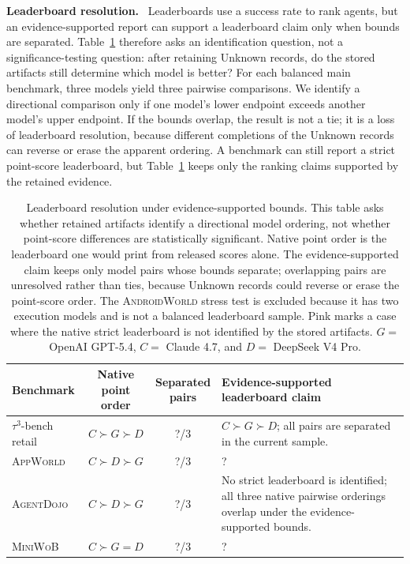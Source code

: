 \documentclass{article}
\newcommand{\agentdojo}{\textsc{AgentDojo}\xspace}
\newcommand{\appworld}{\textsc{AppWorld}\xspace}
\newcommand{\tauthree}{\(\tau^3\)-bench retail\xspace}
\newcommand{\androidworld}{\textsc{AndroidWorld}\xspace}
\newcommand{\miniwob}{\textsc{MiniWoB}\xspace}
\newcommand{\fillfromdata}{\textsc{\color{red}?}}
\newcommand{\runin}[1]{\noindent\textbf{#1}\ }
\providecommand{\ADJIdentifiedPairs}{\fillfromdata}
\providecommand{\APPIdentifiedPairs}{\fillfromdata}
\providecommand{\APPRankingTakeaway}{\fillfromdata}
\providecommand{\MWBIdentifiedPairs}{\fillfromdata}
\providecommand{\MWBRankingTakeaway}{\fillfromdata}
\providecommand{\TAUIdentifiedPairs}{\fillfromdata}
\begin{document}
\runin{Leaderboard resolution.}
Leaderboards use a success rate to rank agents, but an evidence-supported
report can support a leaderboard claim only when bounds are
separated. Table~\ref{tab:main-results-C} therefore asks an identification
question, not a significance-testing question: after retaining Unknown records,
do the stored artifacts still determine which model is better? For each
balanced main benchmark, three models yield three pairwise comparisons. We identify a
directional comparison only if one model's lower endpoint exceeds another
model's upper endpoint. If the bounds overlap, the result is not a tie; it is a
loss of leaderboard resolution, because different completions of the Unknown
records can reverse or erase the apparent ordering. A benchmark can still
report a strict point-score leaderboard, but Table~\ref{tab:main-results-C}
keeps only the ranking claims supported by the retained evidence.

\begin{table}[t]
\centering
\caption{Leaderboard resolution under evidence-supported bounds. This table
asks whether retained artifacts identify a directional model ordering, not
whether point-score differences are statistically significant. Native point
order is the leaderboard one would print from released scores alone. The
evidence-supported claim keeps only model pairs whose bounds separate;
overlapping pairs are unresolved rather than ties, because Unknown records could
reverse or erase the point-score order. The \androidworld stress test is
excluded because it has two execution models and is not a balanced leaderboard
sample. Pink marks a case where the native strict leaderboard is not identified
by the stored artifacts. \(G=\) OpenAI GPT-5.4, \(C=\) Claude 4.7, and
\(D=\) DeepSeek V4 Pro.}
\label{tab:main-results-C}
\footnotesize
\setlength{\tabcolsep}{4pt}
\renewcommand{\arraystretch}{1.14}
\begin{tabularx}{\textwidth}{@{}lccX@{}}
\toprule
Benchmark & \makecell{Native\\point order} & \makecell{Separated\\pairs} & Evidence-supported leaderboard claim \\
\midrule
\tauthree & \(C \succ G \succ D\) & \TAUIdentifiedPairs/3 & \(C \succ G \succ D\); all pairs are separated in the current sample. \\
\appworld & \(C \succ D \succ G\) & \APPIdentifiedPairs/3 & \APPRankingTakeaway \\
\rowcolor{problemrow}
\agentdojo & \(C \succ D \succ G\) & \ADJIdentifiedPairs/3 & No strict leaderboard is identified; all three native pairwise orderings overlap under the evidence-supported bounds. \\
\miniwob & \(C \succ G = D\) & \MWBIdentifiedPairs/3 & \MWBRankingTakeaway \\
\bottomrule
\end{tabularx}
\end{table}
\end{document}
